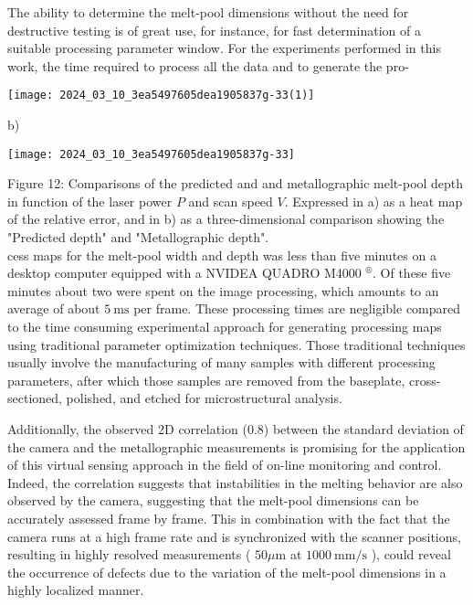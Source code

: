\documentclass[10pt]{article}
\begin{document}
The ability to determine the melt-pool dimensions without the need for destructive testing is of great use, for instance, for fast determination of a suitable processing parameter window. For the experiments performed in this work, the time required to process all the data and to generate the pro-

\begin{center}
\texttt{[image: 2024\_03\_10\_3ea5497605dea1905837g-33(1)]}
\end{center}

b)

\begin{center}
\texttt{[image: 2024\_03\_10\_3ea5497605dea1905837g-33]}
\end{center}

Figure 12: Comparisons of the predicted and and metallographic melt-pool depth in function of the laser power $P$ and scan speed $V$. Expressed in a) as a heat map of the relative error, and in b) as a three-dimensional comparison showing the "Predicted depth" and "Metallographic depth".\\
cess maps for the melt-pool width and depth was less than five minutes on a desktop computer equipped with a NVIDEA QUADRO M4000 ${ }^{\circledR}$. Of these five minutes about two were spent on the image processing, which amounts to an average of about $5 \mathrm{~ms}$ per frame. These processing times are negligible compared to the time consuming experimental approach for generating processing maps using traditional parameter optimization techniques. Those traditional techniques usually involve the manufacturing of many samples with different processing parameters, after which those samples are removed from the baseplate, cross-sectioned, polished, and etched for microstructural analysis.

Additionally, the observed 2D correlation (0.8) between the standard deviation of the camera and the metallographic measurements is promising for the application of this virtual sensing approach in the field of on-line monitoring and control. Indeed, the correlation suggests that instabilities in the melting behavior are also observed by the camera, suggesting that the melt-pool dimensions can be accurately assessed frame by frame. This in combination with the fact that the camera runs at a high frame rate and is synchronized with the scanner positions, resulting in highly resolved measurements ( $50 \mu \mathrm{m}$ at $1000 \mathrm{~mm} / \mathrm{s}$ ), could reveal the occurrence of defects due to the variation of the melt-pool dimensions in a highly localized manner.
\end{document}
